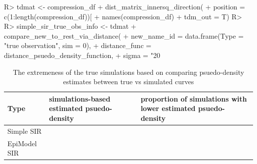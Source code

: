 \documentclass[
  shortnames]{jss}
\begin{document}
\begin{CodeChunk}
\begin{CodeInput}
R> tdmat <- compression_df %
+   dist_matrix_innersq_direction(
+     position = c(1:length(compression_df))[
+       names(compression_df) %
+     tdm_out = T)
R> 
R> simple_sir_true_obs_info <- tdmat %
+   compare_new_to_rest_via_distance(
+     new_name_id = data.frame(Type = "true observation", sim = 0),
+     distance_func = distance_psuedo_density_function, 
+     sigma = "20%
\end{CodeInput}
\end{CodeChunk}

\begin{CodeChunk}
\begin{table}[!h]

\caption{\label{tab:hags-extreme}The extremeness of the true simulations based on comparing psuedo-density estimates between true vs simulated curves}
\centering
\begin{tabular}[t]{l>{\raggedleft\arraybackslash}p{6cm}>{\raggedleft\arraybackslash}p{6cm}}
\toprule
Type & simulations-based estimated psuedo-density & proportion of simulations with lower estimated psuedo-density\\
\midrule
Simple SIR & 0.0036733 & 0.00\\
EpiModel SIR & 0.0149686 & 0.02\\
\bottomrule
\end{tabular}
\end{table}

\end{CodeChunk}


\end{document}
